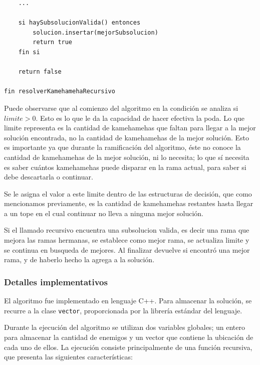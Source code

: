 \begin{enumerate}
\begin{codesnippet}
\begin{verbatim}
    ...
  
    si haySubsolucionValida() entonces
        solucion.insertar(mejorSubsolucion)
        return true
    fin si
  
    return false
  
fin resolverKamehamehaRecursivo
        \end{verbatim}
        \end{codesnippet}

        Puede observarse que al comienzo del algoritmo en la condición se analiza si $limite > 0$. Esto es lo que le da la capacidad de hacer efectiva la poda. 
        Lo que limite representa es la cantidad de kamehamehas que faltan para llegar a la mejor solución encontrada, no la cantidad de kamehamehas de la mejor solución. Esto es importante ya que durante la ramificación del algoritmo, éste no conoce la cantidad de kamehamehas de la mejor solución, ni lo necesita; lo que sí necesita es saber cuántos kamehamehas puede disparar en la rama actual, para saber si debe descartarla o continuar.

        Se le asigna el valor a este limite dentro de las estructuras de decisión, que como mencionamos previamente, es la cantidad de kamehamehas restantes hasta llegar a un tope en el cual continuar no lleva a ninguna mejor solución.

        Si el llamado recursivo encuentra una subsolucion valida, es decir una rama que mejora las ramas hermanas, se establece como mejor rama, se actualiza limite y se continua en busqueda de mejores. Al finalizar devuelve si encontró una mejor rama, y de haberlo hecho la agrega a la solución.

    \end{enumerate}

    \subsubsection{Detalles implementativos}
    
    El algoritmo fue implementado en lenguaje C++. Para almacenar la solución, se recurre a la clase \texttt{vector}, proporcionada por la librería estándar del lenguaje.

    Durante la ejecución del algoritmo se utilizan dos variables globales; un entero para almacenar la cantidad de enemigos y un vector que contiene la ubicación de cada uno de ellos. La ejecución consiste principalmente de una función recursiva, que presenta las siguientes características:

